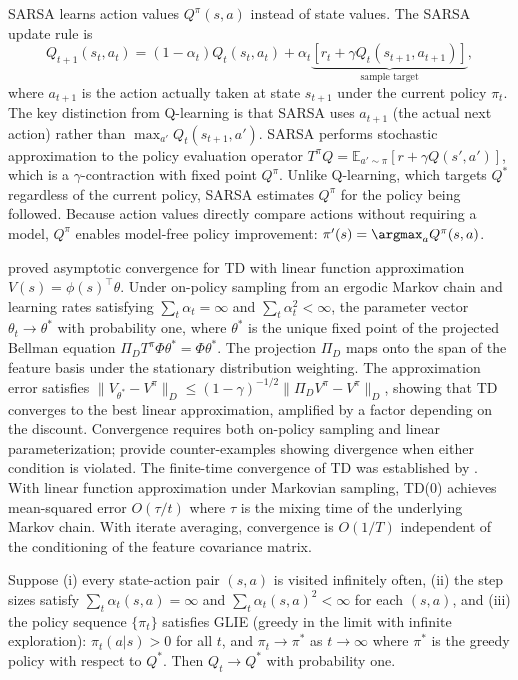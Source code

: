 SARSA learns action values $Q^\pi(s,a)$ instead of state values. The SARSA update rule \citep{rummery1994} is
\begin{equation}
Q_{t+1}(s_t, a_t) = (1 - \alpha_t) Q_t(s_t, a_t) + \alpha_t \underbrace{\left[ r_t + \gamma Q_t(s_{t+1}, a_{t+1}) \right]}_{\text{sample target}},
\label{eq:sarsa}
\end{equation}
where $a_{t+1}$ is the action actually taken at state $s_{t+1}$ under the current policy $\pi_t$. The key distinction from Q-learning is that SARSA uses $a_{t+1}$ (the actual next action) rather than $\max_{a'} Q_t(s_{t+1}, a')$. SARSA performs stochastic approximation to the policy evaluation operator $T^\pi Q = \mathbb{E}_{a' \sim \pi}[r + \gamma Q(s', a')]$, which is a $\gamma$-contraction with fixed point $Q^\pi$. Unlike Q-learning, which targets $Q^*$ regardless of the current policy, SARSA estimates $Q^\pi$ for the policy being followed. Because action values directly compare actions without requiring a model, $Q^\pi$ enables model-free policy improvement: $\pi'(s) = \argmax_a Q^\pi(s,a)$.

\citet{tsitsiklis1997} proved asymptotic convergence for TD with linear function approximation $V(s) = \phi(s)^\top \theta$. Under on-policy sampling from an ergodic Markov chain and learning rates satisfying $\sum_t \alpha_t = \infty$ and $\sum_t \alpha_t^2 < \infty$, the parameter vector $\theta_t \to \theta^*$ with probability one, where $\theta^*$ is the unique fixed point of the projected Bellman equation $\Pi_D T^\pi \Phi\theta^* = \Phi\theta^*$. The projection $\Pi_D$ maps onto the span of the feature basis under the stationary distribution weighting. The approximation error satisfies $\|V_{\theta^*} - V^\pi\|_D \leq (1-\gamma)^{-1/2} \|\Pi_D V^\pi - V^\pi\|_D$, showing that TD converges to the best linear approximation, amplified by a factor depending on the discount. Convergence requires both on-policy sampling and linear parameterization; \citet{tsitsiklis1997} provide counter-examples showing divergence when either condition is violated. The finite-time convergence of TD was established by \citet{bhandari2021finite}. With linear function approximation under Markovian sampling, TD(0) achieves mean-squared error $O(\tau/t)$ where $\tau$ is the mixing time of the underlying Markov chain. With iterate averaging, convergence is $O(1/T)$ independent of the conditioning of the feature covariance matrix.

\begin{theorem}
\label{thm:sarsa_convergence}
Suppose (i) every state-action pair $(s,a)$ is visited infinitely often, (ii) the step sizes satisfy $\sum_t \alpha_t(s,a) = \infty$ and $\sum_t \alpha_t(s,a)^2 < \infty$ for each $(s,a)$, and (iii) the policy sequence $\{\pi_t\}$ satisfies GLIE (greedy in the limit with infinite exploration): $\pi_t(a|s) > 0$ for all $t$, and $\pi_t \to \pi^*$ as $t \to \infty$ where $\pi^*$ is the greedy policy with respect to $Q^*$. Then $Q_t \to Q^*$ with probability one.
\end{theorem}

